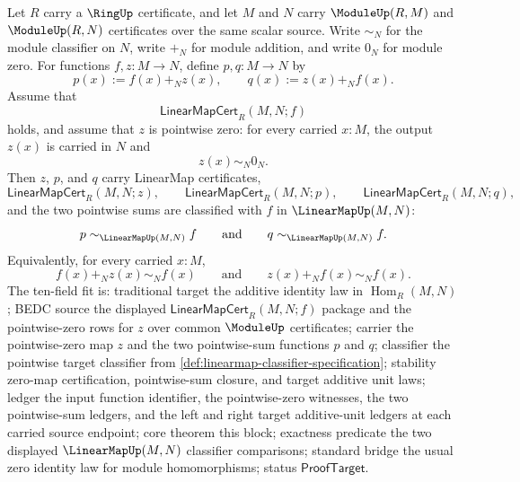 \begin{theorem}
\label{thm:module-linearmap-pointwise-zero-additive-identity}
Let $R$ carry a $\RingUp$ certificate, and let $M$ and $N$ carry $\ModuleUp(R,M)$ and $\ModuleUp(R,N)$ certificates over the same scalar source. Write $\sim_N$ for the module classifier on $N$, write $+_N$ for module addition, and write $0_N$ for module zero. For functions $f,z:M\to N$, define $p,q:M\to N$ by
$$
p(x):=f(x)+_N z(x),
\qquad
q(x):=z(x)+_N f(x).
$$
Assume that
$$
\mathsf{LinearMapCert}_R(M,N;f)
$$
holds, and assume that $z$ is pointwise zero: for every carried $x:M$, the output $z(x)$ is carried in $N$ and
$$
z(x)\sim_N0_N.
$$
Then $z$, $p$, and $q$ carry LinearMap certificates,
$$
\mathsf{LinearMapCert}_R(M,N;z),
\qquad
\mathsf{LinearMapCert}_R(M,N;p),
\qquad
\mathsf{LinearMapCert}_R(M,N;q),
$$
and the two pointwise sums are classified with $f$ in $\LinearMapUp(M,N)$:
$$
p\sim_{\LinearMapUp(M,N)}f
\qquad\text{and}\qquad
q\sim_{\LinearMapUp(M,N)}f.
$$
Equivalently, for every carried $x:M$,
$$
f(x)+_N z(x)\sim_N f(x)
\qquad\text{and}\qquad
z(x)+_N f(x)\sim_N f(x).
$$
The ten-field fit is: traditional target the additive identity law in $\operatorname{Hom}_R(M,N)$; BEDC source the displayed $\mathsf{LinearMapCert}_R(M,N;f)$ package and the pointwise-zero rows for $z$ over common $\ModuleUp$ certificates; carrier the pointwise-zero map $z$ and the two pointwise-sum functions $p$ and $q$; classifier the pointwise target classifier from \autoref{def:linearmap-classifier-specification}; stability zero-map certification, pointwise-sum closure, and target additive unit laws; ledger the input function identifier, the pointwise-zero witnesses, the two pointwise-sum ledgers, and the left and right target additive-unit ledgers at each carried source endpoint; core theorem this block; exactness predicate the two displayed $\LinearMapUp(M,N)$ classifier comparisons; standard bridge the usual zero identity law for module homomorphisms; status $\mathsf{ProofTarget}$.
\end{theorem}
